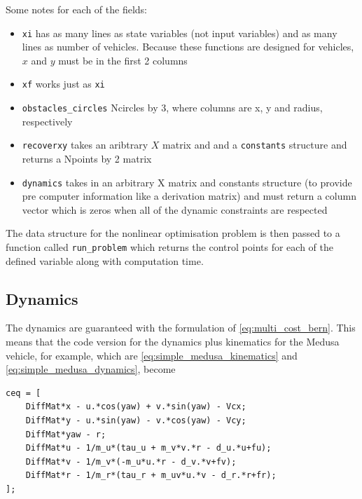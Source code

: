 \par Some notes for each of the fields:

\begin{itemize}
    \item \texttt{xi} has as many lines as state variables (not input variables) and as many lines as number of vehicles. Because these functions are designed for vehicles, $x$ and $y$ must be in the first 2 columns
    \item \texttt{xf} works just as \texttt{xi}
    \item \texttt{obstacles\_circles}  Ncircles by 3, where columns are x, y and radius, respectively
    \item \texttt{recoverxy} takes an aribtrary $X$ matrix and and a \texttt{constants} structure and returns a Npoints by 2 matrix
    \item \texttt{dynamics} takes in an arbitrary X matrix and constants structure (to provide pre computer information like a derivation matrix) and must return a column vector which is zeros when all of the dynamic constraints are respected
\end{itemize}

\par The data structure for the nonlinear optimisation problem is then passed to a function called \texttt{run\_problem} which returns the control points for each of the defined variable along with computation time.

\subsection{Dynamics}
\label{sec:dynamics}

\par The dynamics are guaranteed with the formulation of \ref{eq:multi_cost_bern}. This means that the code version for the dynamics plus kinematics for the Medusa vehicle, for example, which are  \ref{eq:simple_medusa_kinematics} and \ref{eq:simple_medusa_dynamics}, become

\begin{lstlisting}[language=matlabfloz,caption={\mcode{Matlab Function}}]
ceq = [
    DiffMat*x - u.*cos(yaw) + v.*sin(yaw) - Vcx;
    DiffMat*y - u.*sin(yaw) - v.*cos(yaw) - Vcy;
    DiffMat*yaw - r;
    DiffMat*u - 1/m_u*(tau_u + m_v*v.*r - d_u.*u+fu);
    DiffMat*v - 1/m_v*(-m_u*u.*r - d_v.*v+fv);
    DiffMat*r - 1/m_r*(tau_r + m_uv*u.*v - d_r.*r+fr);
];
\end{lstlisting}

